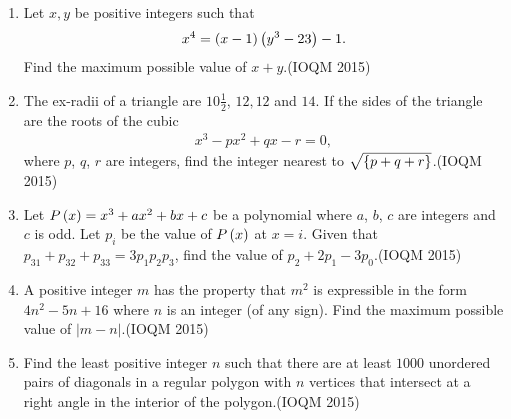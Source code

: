 \begin{enumerate}
	\item Let $x, y$ be positive integers such that 
		\begin{align}
			x^4 = \left(x - 1\right)\left(y^3 - 23\right) - 1.
		\end{align}
Find the maximum possible value of $x + y$.\hfill(IOQM 2015)
    
    \item The ex-radii of a triangle are $10\frac{1}{2}$, $12, 12$ and $14$. If the sides of the triangle are the roots of the cubic 
	    \begin{align}
	x^3 - px^2 + qx - r = 0,
	    \end{align}
where $p$, $q$, $r$ are integers, find the integer nearest to $\sqrt{\left\{p + q + r\right\}}$.\hfill(IOQM 2015)

	\item Let $P\left(x\right) = x^3 + ax^2 + bx + c$ be a polynomial where $a$, $b$, $c$ are integers and $c$ is odd. Let $p_i$ be the value of $P\left(x\right)$ at $x = i$. Given that $p_{31} + p_{32} + p_{33} = 3p_1p_2p_3$, find the value of $p_2 + 2p_1 - 3p_0$.\hfill(IOQM 2015)
    
    \item A positive integer $m$ has the property that $m^2$ is expressible in the form $4n^2 - 5n + 16$ where $n$ is an integer (of any sign). Find the maximum possible value of $|m - n|$.\hfill(IOQM 2015)
    
    \item Find the least positive integer $n$ such that there are at least $1000$ unordered pairs of diagonals in a regular polygon with $n$ vertices that intersect at a right angle in the interior of the polygon.\hfill(IOQM 2015)
    

\end{enumerate}
